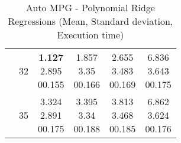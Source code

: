 \begin{table}[p]
\begin{center}
\begin{tabular}{|c|c|c|c|c|c|}
\cline{2-6} & 32 & \minibox{\textbf{1.127} \\ 2.895 \\ 00.155} & \minibox{1.857 \\ 3.35 \\ 00.166} & \minibox{2.655 \\ 3.483 \\ 00.169} & \minibox{6.836 \\ 3.643 \\ 00.175} \\

\cline{2-6} & 35 & \minibox{3.324 \\ 2.891 \\ 00.175} & \minibox{3.395 \\ 3.34 \\ 00.188} & \minibox{3.813 \\ 3.468 \\ 00.185} & \minibox{6.862 \\ 3.624 \\ 00.176} \\

\hline
\end{tabular}

    \caption{Auto MPG - Polynomial Ridge Regressions (Mean, Standard deviation, Execution time)}
    \label{table:db1-polynomialregression}
\end{center}
    \end{table}

